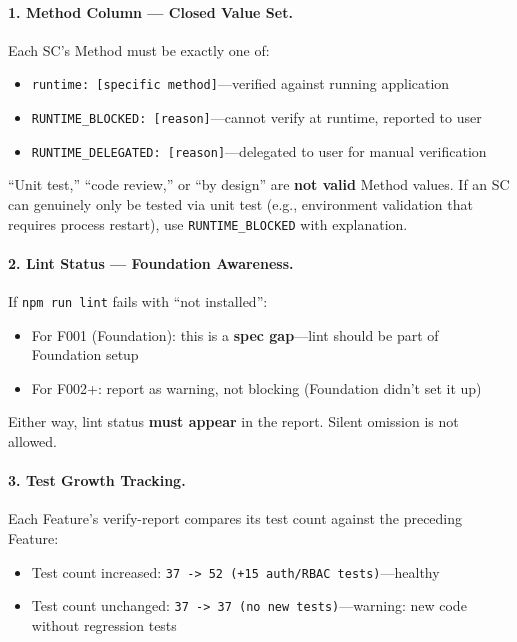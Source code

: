 \documentclass[11pt,a4paper,openright,twoside]{report}
\begin{document}
\paragraph{1. Method Column --- Closed Value Set.}
Each SC's Method must be exactly one of:
\begin{itemize}[nosep]
  \item \texttt{runtime: [specific method]}---verified against running application
  \item \texttt{RUNTIME\_BLOCKED: [reason]}---cannot verify at runtime, reported to user
  \item \texttt{RUNTIME\_DELEGATED: [reason]}---delegated to user for manual verification
\end{itemize}

``Unit test,'' ``code review,'' or ``by design'' are \textbf{not valid} Method values. If an SC can genuinely only be tested via unit test (e.g., environment validation that requires process restart), use \texttt{RUNTIME\_BLOCKED} with explanation.

\paragraph{2. Lint Status --- Foundation Awareness.}
If \texttt{npm run lint} fails with ``not installed'':
\begin{itemize}[nosep]
  \item For F001 (Foundation): this is a \textbf{spec gap}---lint should be part of Foundation setup
  \item For F002+: report as warning, not blocking (Foundation didn't set it up)
\end{itemize}

Either way, lint status \textbf{must appear} in the report. Silent omission is not allowed.

\paragraph{3. Test Growth Tracking.}
Each Feature's verify-report compares its test count against the preceding Feature:
\begin{itemize}[nosep]
  \item Test count increased: \texttt{37 -> 52 (+15 auth/RBAC tests)}---healthy
  \item Test count unchanged: \texttt{37 -> 37 (no new tests)}---warning: new code without regression tests
\end{itemize}
\end{document}
